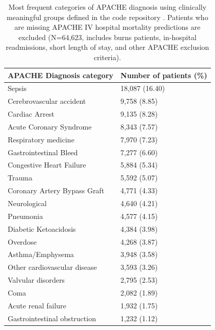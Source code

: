 \documentclass[english]{article}
\begin{document}
\begin{center}
\begin{table}
\begin{tabular}{l|p{4cm}}
APACHE Diagnosis category & Number of patients (\%) \\ \hline
Sepsis                                   & 18,087 (16.40) \\
Cerebrovascular accident                 &  9,758 (8.85) \\
Cardiac Arrest                           &  9,135 (8.28) \\
Acute Coronary Syndrome                  &  8,343 (7.57) \\
Respiratory medicine                     &  7,970 (7.23) \\
Gastrointestinal Bleed                   &  7,277 (6.60) \\
Congestive Heart Failure                 &  5,884 (5.34) \\
Trauma                                   &  5,592 (5.07) \\
Coronary Artery Bypass Graft             &  4,771 (4.33) \\
Neurological                             &  4,640 (4.21) \\
Pneumonia                                &  4,577 (4.15) \\
Diabetic Ketoacidosis                    &  4,384 (3.98) \\
Overdose                                 &  4,268 (3.87) \\
Asthma/Emphysema                         &  3,948 (3.58) \\
Other cardiovascular disease             &  3,593 (3.26) \\
Valvular disorders                       &  2,795 (2.53) \\
Coma                                     &  2,082 (1.89) \\
Acute renal failure                      &  1,932 (1.75) \\
Gastrointestinal obstruction             &  1,232 (1.12) \\
\hline
\end{tabular}
\caption{Most frequent categories of APACHE diagnosis using clinically
meaningful groups defined in the code repository \cite{eicu-code}.
Patients who are missing APACHE IV hospital mortality
predictions are excluded (N=64,623, includes burns patients, in-hospital
readmissions, short length of stay, and other APACHE exclusion criteria).
\label{tab:apachedx_groups}}
\end{table}
\end{center}
\end{document}
